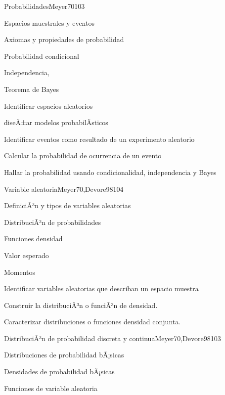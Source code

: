 \begin{syllabus}
\begin{unit}{Probabilidades}{Meyer70}{10}{3}
\begin{topics}
      \item Espacios muestrales y eventos
      \item Axiomas y propiedades de probabilidad
      \item Probabilidad condicional
      \item Independencia,
      \item Teorema de Bayes
   \end{topics}
   \begin{learningoutcomes}
      \item Identificar espacios aleatorios
      \item diseÃ±ar  modelos probabilÃ­sticos
      \item Identificar eventos como resultado de un experimento aleatorio
      \item Calcular la probabilidad de ocurrencia de un evento
      \item Hallar la probabilidad usando condicionalidad, independencia y Bayes
   \end{learningoutcomes}
\end{unit}

\begin{unit}{Variable aleatoria}{Meyer70,Devore98}{10}{4}
\begin{topics}
      \item DefiniciÃ³n y tipos de variables aleatorias
      \item DistribuciÃ³n de probabilidades
      \item Funciones densidad
      \item Valor esperado
      \item Momentos
   \end{topics}

   \begin{learningoutcomes}
      \item Identificar variables aleatorias que describan un espacio muestra
      \item Construir la distribuciÃ³n o funciÃ³n de densidad.
      \item Caracterizar distribuciones o funciones densidad conjunta.
   \end{learningoutcomes}
\end{unit}

\begin{unit}{DistribuciÃ³n de probabilidad discreta y continua}{Meyer70,Devore98}{10}{3}
\begin{topics}
      \item Distribuciones de probabilidad bÃ¡sicas
      \item Densidades de probabilidad bÃ¡sicas
      \item Funciones de variable aleatoria
   \end{topics}


\end{unit}
\end{syllabus}
